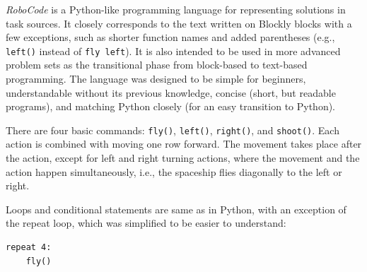 \emph{RoboCode} is a Python-like programming language
for representing solutions in task sources.
It closely corresponds to the text written on Blockly blocks
with a few exceptions, such as %
shorter function names and added parentheses
(e.g., \texttt{left()} instead of \texttt{fly left}).
It is also intended to be used in more advanced problem sets as the
transitional phase from block-based to text-based programming.
The language was designed %
to be simple for beginners, understandable without its previous knowledge,
concise (short, but readable programs),
and matching Python closely (for an easy transition to Python).



There are four basic commands: %
\texttt{fly()},
\texttt{left()},
\texttt{right()}, and
\texttt{shoot()}.
Each action is combined with moving one row forward.
The movement takes place after the action, except for left and right turning actions, where the movement and the action happen simultaneously,
i.e., the spaceship flies diagonally to the left or right.

Loops and conditional statements are same as in Python,
with an exception of the repeat loop,
which was simplified %
to be easier to understand: %
\begin{lstlisting}
repeat 4:
    fly()
\end{lstlisting}

